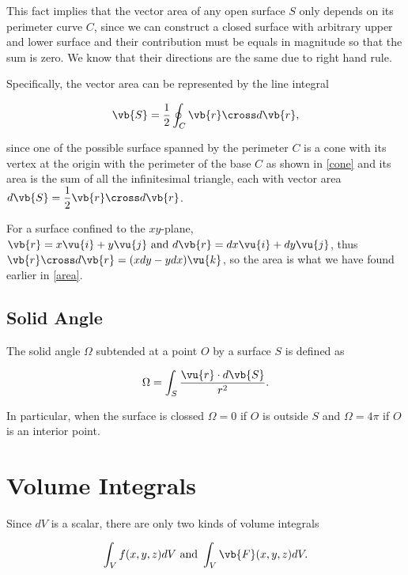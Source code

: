 \documentclass[english,a4paper,12pt]{report}
\begin{document}
This fact implies that the vector area of any open surface \(S\) only depends on its perimeter curve \(C\), since we can construct a closed surface with arbitrary upper and lower surface and their contribution must be equals in magnitude so that the sum is zero. We know that their directions are the same due to right hand rule. 

Specifically, the vector area can be represented by the line integral 

\begin{equation}
	\vb{S} = \frac{1}{2} \oint_{C} \vb{r} \cross d\vb{r}, 
\end{equation}

since one of the possible surface spanned by the perimeter \(C\) is a cone with its vertex at the origin with the perimeter of the base \(C\) as shown in \cref{cone} and its area is the sum of all the infinitesimal triangle, each with vector area \(\displaystyle d\vb{S} = \frac{1}{2} \vb{r} \cross d\vb{r}  \).  


For a surface confined to the \(xy\)-plane, \(\vb{r} = x \vu{i} + y \vu{j} \text { and } d\vb{r} = dx \vu{i} + dy \vu{j}\), thus \(\vb{r} \cross d\vb{r} = (xdy-ydx)\vu{k}\), so the area is what we have found earlier in \cref{area}.   


\subsection{Solid Angle}

The solid angle \(\Omega \) subtended at a point \(O\) by a surface \(S\) is defined as 

\begin{equation}
	\Omega = \int_{S}^{} \frac{\vu{r} \cdot d\vb{S} }{r^2} . 
\end{equation}

In particular, when the surface is clossed \(\Omega = 0\) if \(O\) is outside \(S\) and \(\Omega = 4\pi \) if \(O\) is an interior point.  

\section{Volume Integrals}

Since \(dV\) is a scalar, there are only two kinds of volume integrals

\begin{equation}
	\int_{V}^{} f(x,y,z)dV \text { and } \int_{V}^{} \vb{F} (x,y,z) dV.    
\end{equation}
\end{document}
